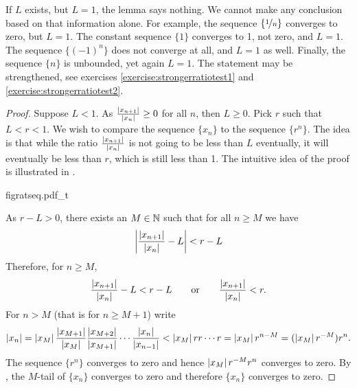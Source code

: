 If $L$ exists, but $L=1$, the lemma says nothing.  We cannot make any
conclusion based on that information alone.  For example,
the sequence $\{ \nicefrac{1}{n} \}$ converges to zero, but $L=1$.
The constant sequence $\{ 1 \}$ converges to 1, not zero, and 
$L=1$.  The sequence $\{ {(-1)}^n \}$ does not converge at all, and $L=1$ as
well.
Finally, the sequence $\{  n \}$ is unbounded, yet again $L=1$.
The statement may be strengthened, see 
exercises \ref{exercise:strongerratiotest1} and
\ref{exercise:strongerratiotest2}.

\begin{proof}
Suppose $L < 1$.
As
$\frac{\left\lvert {x_{n+1}} \right\rvert}{\left\lvert {x_n} \right\rvert} \geq 0$ for all $n$, then $L \geq 0$.  Pick
$r$ such that $L < r < 1$.
We wish to compare the sequence $\{ x_n \}$ to the sequence $\{ r^n \}$.  The idea is that
while the ratio $\frac{\abs{x_{n+1}}}{\abs{x_n}}$ is not going to be less than $L$ eventually,
it will eventually be less than $r$, which is still less than 1.
The intuitive idea of the proof is illustrated in .
\begin{myfigureht}
{figratseq.pdf_t}
\caption{Proof of ratio test in picture.  The short lines represent the
ratios 
$\frac{\abs{x_{n+1}}}{\abs{x_n}}$
approaching $L$.\label{figratseq}}
\end{myfigureht}

As $r-L > 0$, there exists an $M \in {\mathbb{N}}$ such that for
all $n \geq M$ we have
\begin{equation*}
\left\lvert {\frac{\left\lvert {x_{n+1}} \right\rvert}{\left\lvert {x_n} \right\rvert} - L} \right\rvert < r-L 
\end{equation*}
Therefore, for $n \geq M$,
\begin{equation*}
\frac{\left\lvert {x_{n+1}} \right\rvert}{\left\lvert {x_n} \right\rvert} - L < r-L 
\qquad \text{or} \qquad
\frac{\left\lvert {x_{n+1}} \right\rvert}{\left\lvert {x_n} \right\rvert} < r .
\end{equation*}
For $n > M$ (that is for $n \geq M+1$)
write
\begin{equation*}
\left\lvert {x_n} \right\rvert =
\left\lvert {x_M} \right\rvert
\frac{\left\lvert {x_{M+1}} \right\rvert}{\left\lvert {x_{M}} \right\rvert}
\frac{\left\lvert {x_{M+2}} \right\rvert}{\left\lvert {x_{M+1}} \right\rvert}
\cdots
\frac{\left\lvert {x_{n}} \right\rvert}{\left\lvert {x_{n-1}} \right\rvert}
<
\left\lvert {x_M} \right\rvert
r r \cdots r = \left\lvert {x_M} \right\rvert r^{n-M} = (\left\lvert {x_M} \right\rvert r^{-M}) r^n .
\end{equation*}
The sequence $\{ r^n \}$ converges to zero and hence 
$\left\lvert {x_M} \right\rvert r^{-M} r^n$ converges to zero.  By ,
the $M$-tail of 
$\{x_n\}$ converges to zero and therefore $\{x_n\}$ converges to zero.


\end{proof}
